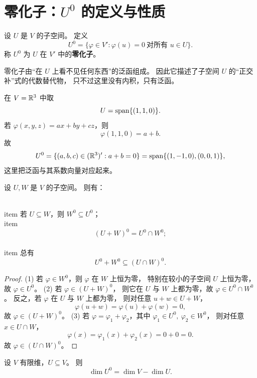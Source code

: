 \section{零化子：$U^0$ 的定义与性质}




\begin{definition} 设 $U$ 是 $V$ 的子空间。 定义 \[ U^0=\{\varphi\in V' : \varphi(u)=0\ \text{对所有 }u\in U\}. \] 称 $U^0$ 为 $U$ 在 $V'$ 中的\textbf{零化子}。 \end{definition} 零化子由“在 $U$ 上看不见任何东西”的泛函组成。 因此它描述了子空间 $U$ 的“正交补”式的代数替代物， 只不过这里没有内积，只有泛函。




\begin{example} 在 $V=\mathbb{R}^3$ 中取 \[ U=\operatorname{span}\{(1,1,0)\}. \] 若 $\varphi(x,y,z)=ax+by+cz$，则 \[ \varphi(1,1,0)=a+b. \] 故 \[ U^0=\{(a,b,c)\in(\mathbb{R}^3)' : a+b=0\} =\operatorname{span}\{(1,-1,0),(0,0,1)\}, \] 这里把泛函与其系数向量对应起来。 \end{example}




\begin{proposition} 设 $U,W$ 是 $V$ 的子空间。 则有：




\begin{enumerate}[label=\textnormal{(\arabic*)}] \\item \basic 若 $U\subseteq W$，则 $W^0\subseteq U^0$； \\item \basic \[ (U+W)^0=U^0\cap W^0; \] \\item \basic 总有 \[ U^0+W^0\subseteq (U\cap W)^0. \] \end{enumerate} \end{proposition}




\begin{proof} (1) 若 $\varphi\in W^0$，则 $\varphi$ 在 $W$ 上恒为零， 特别在较小的子空间 $U$ 上恒为零，故 $\varphi\in U^0$。 (2) 若 $\varphi\in(U+W)^0$， 则它在 $U$ 与 $W$ 上都为零，故 $\varphi\in U^0\cap W^0$。 反之，若 $\varphi$ 在 $U$ 与 $W$ 上都为零， 则对任意 $u+w\in U+W$， \[ \varphi(u+w)=\varphi(u)+\varphi(w)=0, \] 故 $\varphi\in(U+W)^0$。 (3) 若 $\varphi=\varphi_1+\varphi_2$，其中 $\varphi_1\in U^0,\ \varphi_2\in W^0$， 则对任意 $x\in U\cap W$， \[ \varphi(x)=\varphi_1(x)+\varphi_2(x)=0+0=0. \] 故 $\varphi\in(U\cap W)^0$。 \end{proof}




\begin{theorem} 设 $V$ 有限维，$U\subseteq V$。 则 \[ \dim U^0=\dim V-\dim U. \] \end{theorem}




